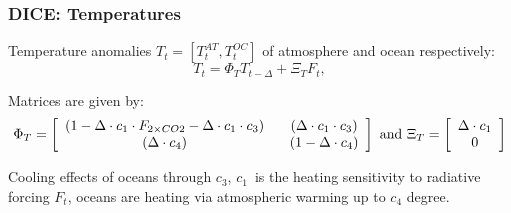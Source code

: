\documentclass[xcolor=x11names,compress,aspectratio=169]{beamer}%
\makeatletter
\renewenvironment{itemize}{\begin{compactitemize}[<+-| alert@+>]}{\end{compactitemize}}
\makeatother
\begin{document}
\begin{frame}%
%

\frametitle{DICE: Temperatures}%


\begin{itemize}
\item Temperature anomalies $T_{t}=[T_{t}^{AT},T_{t}^{OC}]$ of atmosphere and
ocean respectively:%
\begin{equation}
T_{t}=\Phi_{T}T_{t-\Delta}+\Xi_{T}F_{t},\label{eq:temperatures}%
\end{equation}%
\vspace{2ex}%


\item Matrices are given by:%
\[
\Phi_{T}=\left[
\begin{array}
[c]{cc}%
\left(  1-\Delta\cdot c_{1}\cdot F_{2\times CO2}-\Delta\cdot c_{1}\cdot
c_{3}\right)   & \text{ \ }\left(  \Delta\cdot c_{1}\cdot c_{3}\right)  \\
\left(  \Delta\cdot c_{4}\right)   & \text{ \ }\left(  1-\Delta\cdot
c_{4}\right)
\end{array}
\right]  \text{ and }\Xi_{T}=\left[
\begin{array}
[c]{c}%
\Delta\cdot c_{1}\\
0
\end{array}
\right]
\]%
\vspace{2ex}%


\item Cooling effects of oceans through $c_{3}$, $c_{1}$\ is the heating
sensitivity to radiative forcing $F_{t}$, oceans are heating via atmospheric
warming up to $c_{4}$ degree.
\end{itemize}

%

\transboxout
\end{frame}%
%
\end{document}
